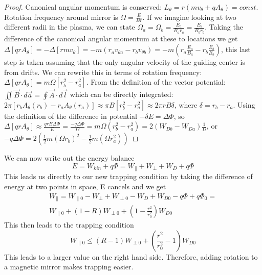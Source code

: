 \documentclass[12pt]{article}
\newtheorem{proof}{Proof}
\begin{document}
\begin{proof}
Canonical angular momentum is conserved: $L_{\theta}=r(mv_{\theta}+qA_{\theta})=const.$
Rotation frequency around mirror is $\Omega=\frac{E}{Br}$. If we imagine looking at two 
different radii in the plasma, we can state $\Omega_a=\Omega_b=\frac{E_a}{B_ar_a}=\frac{E_b}
{B_br_b}$. Taking the difference of the canonical angular momentum at these to locations we get 
$\Delta[qrA_{\theta}]=-\Delta[rmv_{\theta}]=-m(r_av_{\theta a}-r_bv_{\theta b})=-m\left(r_a
\frac{E_a}{B_a}-r_b\frac{E_b}{B_b}\right)$, this last step is taken assuming that the only 
angular velocity of the guiding center is from drifts. We can rewrite this in terms of rotation 
frequency: $\Delta[qrA_{\theta}]=m\Omega[r_b^2-r_a^2]$. From the definition of the vector 
potential: $\iint\vec{B}\cdot d\vec{a}=\oint \vec{A}\cdot d\vec{l}$ which can be directly 
integrated: $2\pi[r_bA_{\theta}(r_b)-r_aA_{\theta}(r_a)]\approx\pi B[r_b^2-r_a^2]\approx 2\pi rB
\delta$, where $\delta=r_b-r_a$. Using the definition of the difference in potential $-\delta E=
\Delta\Phi$, so $\Delta [qrA_{\theta}]\approx\frac{qrB\Delta\Phi}{E}=\frac{-q\Delta\Phi}{\Omega}
=m\Omega (r_b^2-r_a^2)=2(W_{Db}-W_{Da})\frac{1}{\Omega}$, or $-q\Delta\Phi=2\left(\frac{1}{2}
m(\Omega r_b)^2-\frac{1}{2}m(\Omega r_a^2)\right)$  
\end{proof}
We can now write out the energy balance
\begin{equation}\label{ebenergy}
E=W_{kin}+q\Phi=W_{\parallel}+W_{\perp}+W_D+q\Phi
\end{equation}
This leads us directly to our new trapping condition by taking the difference of energy at two points in space, E cancels and we get
\begin{equation}
\begin{split}
W_{\parallel}=W_{\parallel 0}-W_{\perp}+W_{\perp0}-W_D+W_{D0}-q\Phi+q\Phi_0=\\
W_{\parallel0}+(1-R)
W_{\perp0}+\left(1-\frac{r^2}{r_0^2}\right) W_{D0}
\end{split}
\end{equation}
This then leads to the trapping condition
\begin{equation}\label{trappingeb}
W_{\parallel 0}\leq (R-1)W_{\perp 0}+\left(\frac{r^2}{r^2_0}-1\right)W_{D0}
\end{equation}
This leads to a larger value on the right hand side. Therefore, adding rotation to a magnetic mirror makes trapping easier.
\end{document}
